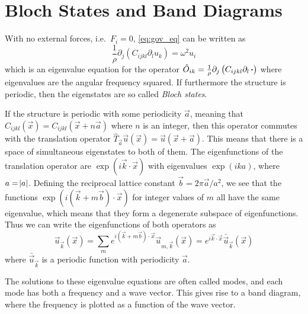 \section{Bloch States and Band Diagrams}

With no external forces, i.e.\ $F_i = 0$, \cref{eq:gov_eq} can be written as
\begin{equation}
	\frac 1 \rho \partial_j \left(C_{ijkl} \partial_l u_k\right) = \omega^2 u_i
\end{equation}
which is an eigenvalue equation for the operator
$\hat O_{ik} = \frac 1 \rho\partial_j \left(C_{ijkl} \partial_l \operatorname{\boldsymbol{\cdot}}\right)$
where eigenvalues are the angular frequency squared.
If furthermore the structure is periodic, then the eigenstates are so called
\emph{Bloch states}.

If the structure is periodic with some periodicity $\vec a$,
meaning that $C_{ijkl}(\vec x) = C_{ijkl}(\vec x + n \vec a)$ where $n$ is an
integer, then this operator commutes with the translation operator
$\hat T_{\vec a} \vec u(\vec x) = \vec u(\vec x + \vec a)$.
This means that there is a space of simultaneous eigenstates to both of them.
The eigenfunctions of the translation operator are $\exp(i \vec k \cdot \vec
x)$ with eigenvalues $\exp(i k a)$, where $a = \abs{a}$.
Defining the reciprocal lattice constant $\vec b = 2 \pi \vec a / a^2$, we see
that the functions $\exp(i (\vec k + m \vec b) \cdot \vec x)$ for integer values
of $m$ all have the same eigenvalue, which means that they form a degenerate
subspace of eigenfunctions.
Thus we can write the eigenfunctions of both operators as
\begin{equation}
	\vec u_{\vec k}(\vec x) = \sum_m e^{i (\vec k + m \vec b) \cdot \vec x}
	\vec u_{m, \vec k}(\vec x)
	= e^{i \vec k \cdot \vec x} \bar{\vec u}_{\vec k}(\vec x)
\end{equation}
where $\bar{\vec{u}}_{\vec{k}}$ is a periodic function with periodicity $\vec a$.

The solutions to these eigenvalue equations are often called modes, and each
mode has both a frequency and a wave vector. This gives rise to a band diagram,
where the frequency is plotted as a function of the wave vector.

